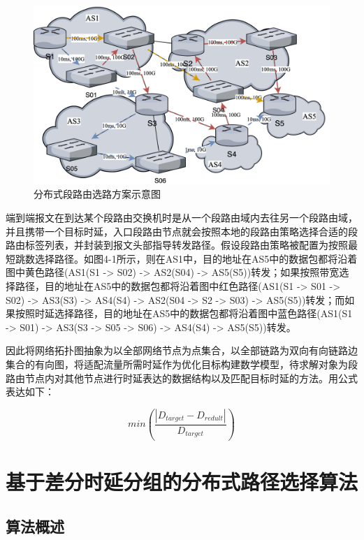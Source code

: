 \begin{figure}[htbp]
\setlength{\abovecaptionskip}{15pt plus 3pt minus 2pt}
\centerline{\includegraphics[width=1\textwidth]{./figures/ch4-problem-model.png}}
\caption{分布式段路由选路方案示意图}
\label{fig-ch4-problem-model}
\end{figure}    

端到端报文在到达某个段路由交换机时是从一个段路由域内去往另一个段路由域，并且携带一个目标时延，入口段路由节点就会按照本地的段路由策略选择合适的段路由标签列表，并封装到报文头部指导转发路径。假设段路由策略被配置为按照最短跳数选择路径。如图4-1所示，则在AS1中，目的地址在AS5中的数据包都将沿着图中黄色路径(AS1(S1 -> S02) -> AS2(S04) -> AS5(S5))转发；如果按照带宽选择路径，目的地址在AS5中的数据包都将沿着图中红色路径(AS1(S1 -> S01 -> S02) -> AS3(S3) -> AS4(S4) -> AS2(S04 -> S2 -> S03) -> AS5(S5))转发；而如果按照时延选择路径，目的地址在AS5中的数据包都将沿着图中蓝色路径(AS1(S1 -> S01) -> AS3(S3 -> S05 -> S06) -> AS4(S4) -> AS5(S5))转发。

因此将网络拓扑图抽象为以全部网络节点为点集合，以全部链路为双向有向链路边集合的有向图，将适配流量所需时延作为优化目标构建数学模型，待求解对象为段路由节点内对其他节点进行时延表达的数据结构以及匹配目标时延的方法。用公式表达如下：

\begin{equation} \label{distributed segment routing target}
    min(\frac{|D_{target}-D_{redult}|}{D_{target}})
\end{equation}

\section{基于差分时延分组的分布式路径选择算法}

\subsection{算法概述}

